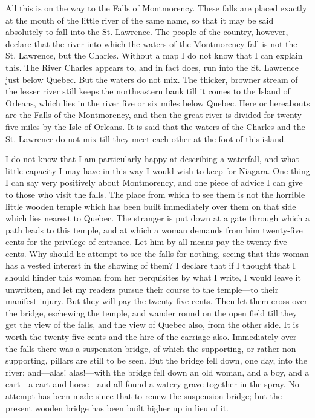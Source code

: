 All this is on the way to the Falls of Montmorency.  These falls
are placed exactly at the mouth of the little river of the same
name, so that it may be said absolutely to fall into the St.
Lawrence.  The people of the country, however, declare that the
river into which the waters of the Montmorency fall is not the St.
Lawrence, but the Charles.  Without a map I do not know that I can
explain this.  The River Charles appears to, and in fact does, run
into the St. Lawrence just below Quebec.  But the waters do not
mix.  The thicker, browner stream of the lesser river still keeps
the northeastern bank till it comes to the Island of Orleans, which
lies in the river five or six miles below Quebec.  Here or
hereabouts are the Falls of the Montmorency, and then the great
river is divided for twenty-five miles by the Isle of Orleans.  It
is said that the waters of the Charles and the St. Lawrence do not
mix till they meet each other at the foot of this island.

I do not know that I am particularly happy at describing a
waterfall, and what little capacity I may have in this way I would
wish to keep for Niagara.  One thing I can say very positively
about Montmorency, and one piece of advice I can give to those who
visit the falls.  The place from which to see them is not the
horrible little wooden temple which has been built immediately over
them on that side which lies nearest to Quebec.  The stranger is
put down at a gate through which a path leads to this temple, and
at which a woman demands from him twenty-five cents for the
privilege of entrance.  Let him by all means pay the twenty-five
cents.  Why should he attempt to see the falls for nothing, seeing
that this woman has a vested interest in the showing of them?  I
declare that if I thought that I should hinder this woman from her
perquisites by what I write, I would leave it unwritten, and let my
readers pursue their course to the temple---to their manifest
injury.  But they will pay the twenty-five cents.  Then let them
cross over the bridge, eschewing the temple, and wander round on
the open field till they get the view of the falls, and the view of
Quebec also, from the other side.  It is worth the twenty-five
cents and the hire of the carriage also.  Immediately over the
falls there was a suspension bridge, of which the supporting, or
rather non-supporting, pillars are still to be seen.  But the
bridge fell down, one day, into the river; and---alas! alas!---with
the bridge fell down an old woman, and a boy, and a cart---a cart
and horse---and all found a watery grave together in the spray.  No
attempt has been made since that to renew the suspension bridge;
but the present wooden bridge has been built higher up in lieu of
it.

